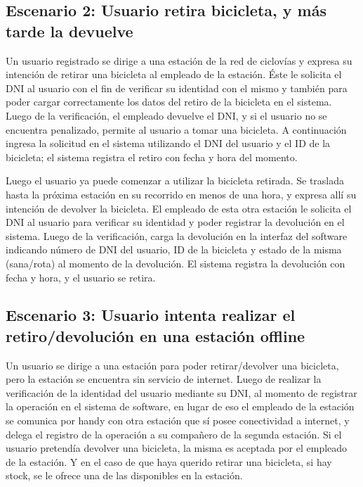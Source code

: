 \documentclass[a4paper, 10pt, twoside]{article}
\begin{document}
\subsection{Escenario 2: Usuario retira bicicleta, y más tarde la devuelve}

Un usuario registrado se dirige a una estación de la red de ciclovías y expresa su intención de retirar una bicicleta al empleado de la estación. Éste le solicita el DNI al usuario con el fin de verificar su identidad con el mismo y también para poder cargar correctamente los datos del retiro de la bicicleta en el sistema. Luego de la verificación, el empleado devuelve el DNI, y si el usuario no se encuentra penalizado, permite al usuario a tomar una bicicleta. A continuación ingresa la solicitud en el sistema utilizando el DNI del usuario y el ID de la bicicleta; el sistema registra el retiro con fecha y hora del momento.

Luego el usuario ya puede comenzar a utilizar la bicicleta retirada. Se traslada hasta la próxima estación en su recorrido en menos de una hora, y expresa allí su intención de devolver la bicicleta. El empleado de esta otra estación le solicita el DNI al usuario para verificar su identidad y poder registrar la devolución en el sistema. Luego de la verificación, carga la devolución en la interfaz del software indicando número de DNI del usuario, ID de la bicicleta y estado de la misma (sana/rota) al momento de la devolución. El sistema registra la devolución con fecha y hora, y el usuario se retira.


\subsection{Escenario 3: Usuario intenta realizar el retiro/devolución en una estación offline}

Un usuario se dirige a una estación para poder retirar/devolver una bicicleta, pero la estación se encuentra sin servicio de internet. Luego de realizar la verificación de la identidad del usuario mediante su DNI, al momento de registrar la operación en el sistema de software, en lugar de eso el empleado de la estación se comunica por handy con otra estación que sí posee conectividad a internet, y delega el registro de la operación a su compañero de la segunda estación. Si el usuario pretendía devolver una bicicleta, la misma es aceptada por el empleado de la estación. Y en el caso de que haya querido retirar una bicicleta, si hay stock, se le ofrece una de las disponibles en la estación.
\end{document}
